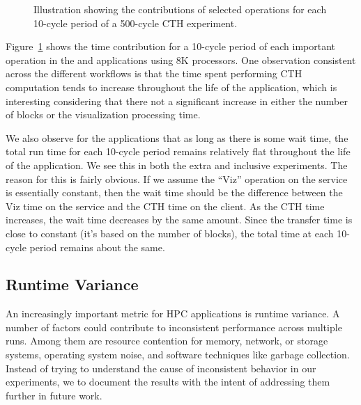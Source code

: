 \begin{figure}[bp]
\begin{centering}
\caption[Time-series plots of experiments.]{Illustration showing the
contributions of selected operations for each 10-cycle period of a 500-cycle
CTH experiment.
}
\label{fig:time-series}
\end{centering}
\end{figure}


Figure~\ref{fig:time-series} shows
the time contribution for a 10-cycle period of each important operation in the
\insitu and \intransit applications using 8K processors.  One observation
consistent across the different workflows is that the time spent performing
CTH computation tends to increase throughout the life of the application,
which is interesting considering that there not a significant increase in
either the number of blocks or the visualization processing time.

We also observe for the \intransit applications that as long as there is some
wait time, the total run time for each 10-cycle period remains relatively flat
throughout the life of the application.  We see this in both the \intransit
extra and \intransit inclusive experiments.  The reason for this is fairly
obvious.  If we assume the ``Viz'' operation on the service is essentially
constant, then the wait time should be the difference between the Viz time on
the service and the CTH time on the client.  As the CTH time increases, the
wait time decreases by the same amount.  Since the transfer time is close to
constant (it's based on the number of blocks), the total time at each 10-cycle
period remains about the same.


\FloatBarrier

\subsection{Runtime Variance}

An increasingly important metric for HPC applications is runtime variance.  A
number of factors could contribute to inconsistent performance across multiple runs. Among
them are resource contention for memory, network, or storage systems, operating
system noise, and software techniques like garbage collection.
Instead of trying to understand the cause of inconsistent behavior in our
experiments, we to document the results with the intent of addressing
them further in future work.

